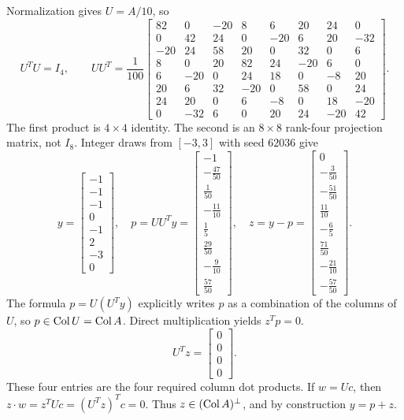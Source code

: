 Normalization gives $U=A/10$, so
\[U^TU=I_4,\qquad UU^T=\frac1{100}\left[\begin{array}{rrrrrrrr}82&0&-20&8&6&20&24&0\\0&42&24&0&-20&6&20&-32\\-20&24&58&20&0&32&0&6\\8&0&20&82&24&-20&6&0\\6&-20&0&24&18&0&-8&20\\20&6&32&-20&0&58&0&24\\24&20&0&6&-8&0&18&-20\\0&-32&6&0&20&24&-20&42\end{array}\right].\]
The first product is $4\times4$ identity. The second is an $8\times8$ rank-four projection matrix, not $I_8$.
Integer draws from $[-3,3]$ with seed $62036$ give
\[y=\left[\begin{array}{r}-1\\-1\\-1\\0\\-1\\2\\-3\\0\end{array}\right],\quad p=UU^Ty=\left[\begin{array}{r}-1\\- \frac{47}{50}\\\frac{1}{50}\\- \frac{11}{10}\\\frac{1}{5}\\\frac{29}{50}\\- \frac{9}{10}\\\frac{57}{50}\end{array}\right],\quad z=y-p=\left[\begin{array}{r}0\\- \frac{3}{50}\\- \frac{51}{50}\\\frac{11}{10}\\- \frac{6}{5}\\\frac{71}{50}\\- \frac{21}{10}\\- \frac{57}{50}\end{array}\right].\]
The formula $p=U(U^Ty)$ explicitly writes $p$ as a combination of the columns of $U$, so $p\in\operatorname{Col} U=\operatorname{Col} A$. Direct multiplication yields $z^Tp=0$.
\[U^Tz=\left[\begin{array}{r}0\\0\\0\\0\end{array}\right].\]
These four entries are the four required column dot products.
If $w=Uc$, then $z\cdot w=z^TUc=(U^Tz)^Tc=0$. Thus $z\in(\operatorname{Col} A)^\perp$, and by construction $y=p+z$.
